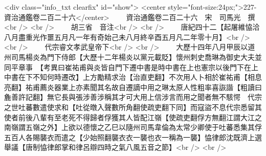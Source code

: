 <div class="info_txt clearfix" id="show">
<center style="font-size:24px;">227-資治通鑑卷二百二十六</center>
  　　資治通鑑卷二百二十六　宋　司馬光　撰<br />
<br />
　　胡三省　音注<br />
<br />
　　唐紀四十二【起屠維恊洽八月盡重光作噩五月凡一年有奇始己未八月終辛酉五月凡二年零十月】<br />
<br />
　　代宗睿文孝武皇帝下<br />
<br />
　　大歷十四年八月甲辰以道州司馬楊炎為門下侍郎【大歷十二年楊炎以黨元載貶】懷州刺史喬琳為御史大夫並同平章事　【考異曰崔祐甫與炎皆自門下遷中書是時中書在上也憲宗以後門下在上中書在下不知何時遷改】上方勵精求治【治直吏翻】不次用人卜相於崔祐甫【相息亮翻】祐甫薦炎器業上亦素聞其名故自遷謫中用之琳太原人性粗率喜詼諧【粗讀曰麁善許記翻】無它長與張涉善涉稱其才可大用上信涉言而用之聞者無不駭愕　代宗之世吐蕃數遣使求和【吐從暾入聲數所角翻使疏吏翻下同】而寇盜不息代宗悉留其使者前後八輩有至老死不得歸者俘獲其人皆配江嶺【使疏吏翻俘方無翻江謂大江之南嶺謂五嶺之外】上欲以德懷之乙巳以隨州司馬韋倫為太常少卿使于吐蕃悉集其俘五百人各賜襲衣而遣之【少始照翻襲衣衣一襲也衣一稱為一襲】恊律郎沈既濟上選舉議【唐制恊律郎掌和律呂辯四時之氣八風五音之節】<br />
<br />
